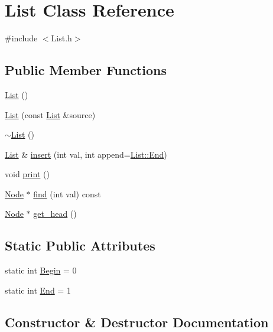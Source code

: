 \hypertarget{classList}{}\section{List Class Reference}
\label{classList}


{\ttfamily \#include $<$List.\+h$>$}

\subsection*{Public Member Functions}
\begin{DoxyCompactItemize}
\item 
\mbox{\hyperlink{classList_a64d878a92d11f7c63c70cbe4e7dd4176}{List}} ()
\item 
\mbox{\hyperlink{classList_a8330042d1deb6695fc7516d1ea5552f9}{List}} (const \mbox{\hyperlink{classList}{List}} \&source)
\item 
\mbox{\hyperlink{classList_a70aecf37bd9d779a394e4d50377fbf5f}{$\sim$\+List}} ()
\item 
\mbox{\hyperlink{classList}{List}} \& \mbox{\hyperlink{classList_a7c7cd2ffe6d41eb9e9d61b00c9fbd787}{insert}} (int val, int append=\mbox{\hyperlink{classList_afbd07ca49b66b1233c4a6292454b5673}{List\+::\+End}})
\item 
void \mbox{\hyperlink{classList_ac334b7866f8dd21f730442b2553df60f}{print}} ()
\item 
\mbox{\hyperlink{classNode}{Node}} $\ast$ \mbox{\hyperlink{classList_a7d2bb48045c781a76a0daf2a4dc7d8fc}{find}} (int val) const
\item 
\mbox{\hyperlink{classNode}{Node}} $\ast$ \mbox{\hyperlink{classList_a8351c5dd882163133787a70911372dd6}{get\+\_\+head}} ()
\end{DoxyCompactItemize}
\subsection*{Static Public Attributes}
\begin{DoxyCompactItemize}
\item 
static int \mbox{\hyperlink{classList_a61fd49ab9baba79cdff2659b428d8bdf}{Begin}} = 0
\item 
static int \mbox{\hyperlink{classList_afbd07ca49b66b1233c4a6292454b5673}{End}} = 1
\end{DoxyCompactItemize}


\subsection{Constructor \& Destructor Documentation}
\mbox{\label{classList_a64d878a92d11f7c63c70cbe4e7dd4176}} 
